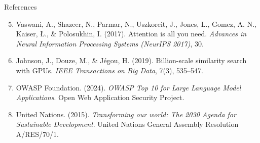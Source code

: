 \documentclass[aspectratio=169,10pt]{beamer}
\begin{document}
\begin{frame}{References}
  \footnotesize
  \begin{enumerate}
    \setcounter{enumi}{4}
    \item Vaswani, A., Shazeer, N., Parmar, N., Uszkoreit, J., Jones, L., Gomez, A. N., Kaiser, \L., \& Polosukhin, I. (2017). Attention is all you need. \textit{Advances in Neural Information Processing Systems (NeurIPS 2017)}, 30.
    \item Johnson, J., Douze, M., \& J\'egou, H. (2019). Billion-scale similarity search with GPUs. \textit{IEEE Transactions on Big Data}, 7(3), 535--547.
    \item OWASP Foundation. (2024). \textit{OWASP Top 10 for Large Language Model Applications}. Open Web Application Security Project.
    \item United Nations. (2015). \textit{Transforming our world: The 2030 Agenda for Sustainable Development}. United Nations General Assembly Resolution A/RES/70/1.
  \end{enumerate}
\end{frame}
\end{document}
